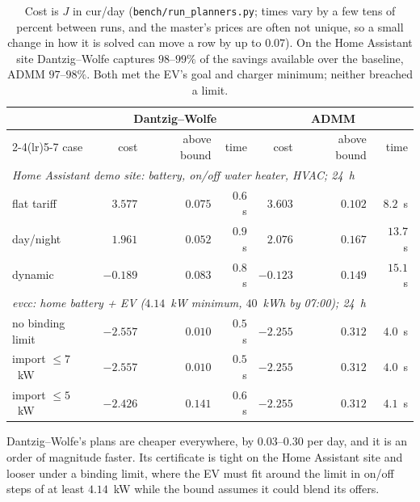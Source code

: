 \documentclass[11pt,a4paper]{article}
\begin{document}
\begin{table}[htbp]
\centering
\small
\begin{tabular}{lrrrrrr}
\toprule
& \multicolumn{3}{c}{Dantzig--Wolfe} & \multicolumn{3}{c}{ADMM} \\
\cmidrule(lr){2-4}\cmidrule(lr){5-7}
case & cost & above bound & time & cost & above bound & time \\
\midrule
\multicolumn{7}{l}{\emph{Home Assistant demo site: battery, on/off water heater, HVAC; 24~h}} \\
flat tariff        & $3.577$ & $0.075$ & $0.6$~s & $3.603$ & $0.102$ & $8.2$~s \\
day/night          & $1.961$ & $0.052$ & $0.9$~s & $2.076$ & $0.167$ & $13.7$~s \\
dynamic            & $-0.189$ & $0.083$ & $0.8$~s & $-0.123$ & $0.149$ & $15.1$~s \\
\midrule
\multicolumn{7}{l}{\emph{evcc: home battery + EV ($4.14$~kW minimum, $40$~kWh by 07:00); 24~h}} \\
no binding limit   & $-2.557$ & $0.010$ & $0.5$~s & $-2.255$ & $0.312$ & $4.0$~s \\
import $\le 7$~kW  & $-2.557$ & $0.010$ & $0.5$~s & $-2.255$ & $0.312$ & $4.0$~s \\
import $\le 5$~kW  & $-2.426$ & $0.141$ & $0.6$~s & $-2.255$ & $0.312$ & $4.1$~s \\
\bottomrule
\end{tabular}
\caption{Cost is $J$ in cur/day (\texttt{bench/run\_planners.py}; times vary by
a few tens of percent between runs, and the master's prices are often not unique,
so a small change in how it is solved can move a row by up to $0.07$). On the
Home Assistant site Dantzig--Wolfe captures $98$--$99\%$ of the savings available
over the baseline, ADMM $97$--$98\%$. Both met the EV's goal and charger minimum;
neither breached a limit.}
\label{tab:compare}
\end{table}

Dantzig--Wolfe's plans are cheaper everywhere, by $0.03$--$0.30$ per day, and it
is an order of magnitude faster. Its certificate is tight on the Home Assistant
site and looser under a binding limit, where the EV must fit around the limit in
on/off steps of at least $4.14$~kW while the bound assumes it could blend its
offers.
\end{document}
